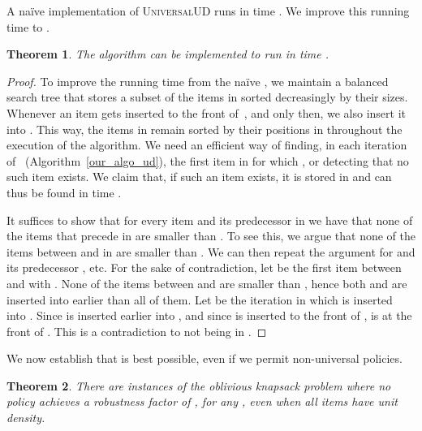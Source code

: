\documentclass[11pt]{article}
\newcommand{\noun}[1]{\textsc{#1}}
\newtheorem{theorem}{Theorem}
\begin{document}
A naïve implementation of \noun{UniversalUD }runs in time .
We improve this running time to . 
\begin{theorem}
The algorithm  can be implemented to run in
time . \label{thm:running time UniversalUD}\end{theorem}
\begin{proof}
To improve the running time from the naïve , we maintain
a balanced search tree  that stores a subset of the items in 
sorted decreasingly by their sizes. Whenever an item gets inserted
to the front of~, and only then, we also insert it into .
This way, the items in  remain sorted by their positions in 
throughout the execution of the algorithm. We need an efficient way
of finding, in each iteration  of ~(Algorithm~\ref{our_algo_ud}),
the first item  in  for which ,
or detecting that no such item exists. We claim that, if such an item
exists, it is stored in  and can thus be found in time .

It suffices to show that for every item  and its predecessor
 in  we have that none of the items that precede  in 
are smaller than . To see this, we argue that none of the items
between  and  in  are smaller than . We can then
repeat the argument for  and its predecessor , etc. For the
sake of contradiction, let  be the first item between  and
 with . None of the items between  and 
are smaller than , hence both  and  are inserted into
 earlier than all of them. Let  be the iteration in which
 is inserted into . Since  is inserted earlier into
, and since  is inserted to the front of , 
is at the front of . This is a contradiction to 
not being in .
\end{proof}
We now establish that  is best possible, even
if we permit non-universal policies.
\begin{theorem}
There are instances of the oblivious knapsack problem where no policy
achieves a robustness factor of , for any ,
even when all items have unit density.\end{theorem}
\end{document}
